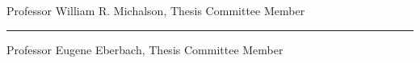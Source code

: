 Professor William R. Michalson, Thesis Committee Member	

\vspace{0.5in}
\rule{3in}{0.8pt}

Professor Eugene Eberbach, Thesis Committee Member	

%
%
%
%
%
%
%
%
%
%
%
%
